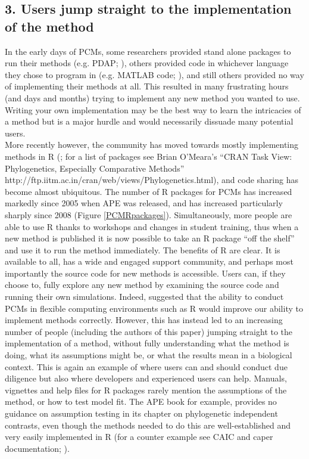 \documentclass[a4paper,12pt]{article}
\begin{document}
  \subsection{3. Users jump straight to the implementation of the method}
    In the early days of PCMs, some researchers provided stand alone packages to run their methods (e.g. PDAP; \citealp{diaz1996testing}), others provided code in whichever language they chose to program in (e.g. MATLAB code; \citealp{rohlf2001comparative}), and still others provided no way of implementing their methods at all. 
    This resulted in many frustrating hours (and days and months) trying to implement any new method you wanted to use.
    Writing your own implementation may be the best way to learn the intricacies of a method but is a major hurdle and would necessarily dissuade many potential users.  \\

    More recently however, the community has moved towards mostly implementing methods in R (\citealp{R-Core-Team:2014aa}; for a list of packages see Brian O'Meara's ``CRAN Task View: Phylogenetics, Especially Comparative Methods'' http://ftp.iitm.ac.in/cran/web/views/Phylogenetics.html), and code sharing has become almost ubiquitous. 
    The number of R packages for PCMs has increased markedly since 2005 when APE \citep{Paradis:2004aa} was released, and has increased particularly sharply since 2008 (Figure \ref{PCMRpackages}).
    Simultaneously, more people are able to use R thanks to workshops and changes in student training, thus when a new method is published it is now possible to take an R package ``off the shelf'' and use it to run the method immediately.
    The benefits of R are clear. 
    It is available to all, has a wide and engaged support community, and perhaps most importantly the source code for new methods is accessible.
    Users can, if they choose to, fully explore any new method by examining the source code and running their own simulations. 
    Indeed, \citet{freckleton2009seven} suggested that the ability to conduct PCMs in flexible computing environments such as R would improve our ability to implement methods correctly. 
    However, this has instead led to an increasing number of people (including the authors of this paper) jumping straight to the implementation of a method, without fully understanding what the method is doing, what its assumptions might be, or what the results mean in a biological context.
    This is again an example of where users can and should conduct due diligence but also where developers and experienced users can help.
    Manuals, vignettes and help files for R packages rarely mention the assumptions of the method, or how to test model fit. 
    The APE book \citep{paradis2011analysis} for example, provides no guidance on assumption testing in its chapter on phylogenetic independent contrasts, even though the methods needed to do this are well-established and very easily implemented in R (for a counter example see CAIC and caper documentation; \citealp{purvis1995comparative,Orme:2013aa}).
\end{document}
